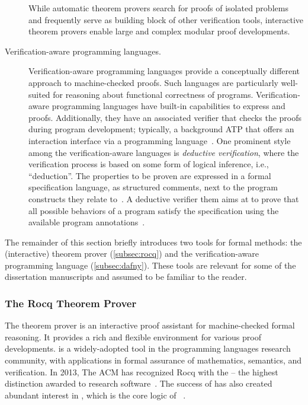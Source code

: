 \begin{description}
While automatic theorem provers search for proofs of isolated problems and frequently serve as building block of other verification tools,
interactive theorem provers enable large and complex modular proof developments.

\item[Verification-aware programming languages.]
Verification-aware programming languages provide a conceptually different approach to machine-checked proofs.
Such languages are particularly well-suited for reasoning about functional correctness of programs.
Verification-aware programming languages have built-in capabilities to express  and proofs.
Additionally, they have an associated verifier that checks the proofs during program development;
typically, a background ATP that offers an interaction interface via a programming language~\cite{leino2023}.
One prominent style among the verification-aware languages is \emph{deductive verification},
where the verification process is based on some form of logical inference, i.e., \enquote{deduction}.
The properties to be proven are expressed in a formal specification language, as structured comments, next to the program constructs they relate to~\cite{hahnle2019}.
A deductive verifier them aims at to prove that all possible behaviors of a program satisfy the specification using the available program annotations~\cite{cassez2022}.
\end{description}

The remainder of this section briefly introduces two tools for formal methods:
the (interactive)  theorem prover (\autoref{subsec:rocq}) and the
verification-aware programming language  (\autoref{subsec:dafny}).
These tools are relevant for some of the dissertation manuscripts and assumed to
be familiar to the reader.

\subsubsection{The Rocq Theorem Prover}
\label{subsec:rocq}

The  theorem prover is an interactive proof assistant for machine-checked formal reasoning.
It provides a rich and flexible environment for various proof developments.
 is a widely-adopted tool in the programming languages research community, with applications in formal assurance of mathematics, semantics, and verification.
In 2013, The ACM has recognized Rocq with the
\href{https://awards.acm.org/software-system}{} --
the highest distinction awarded to research software~\cite{rocq-community}.
The success of  has also created abundant interest in ,
which is the core logic of ~\cite{coquand1988}.

